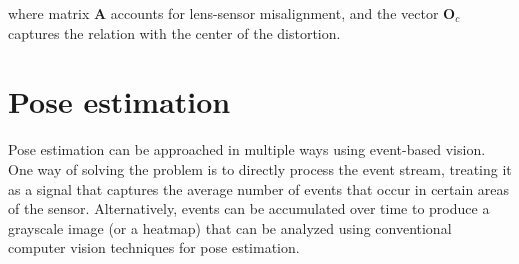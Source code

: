 where matrix $\textbf{A}$ accounts for lens-sensor misalignment, and the vector $\textbf{O}_c$ captures the relation with the center of the distortion. 




\section{Pose estimation}


Pose estimation can be approached in multiple ways using event-based vision. One way of solving the problem is to directly process the
event stream, treating it as a signal
that captures the average number of events that occur in certain areas of the sensor.
Alternatively, events can be accumulated over time to produce a grayscale image
(or a heatmap) that can be analyzed using conventional computer vision techniques for pose estimation.

